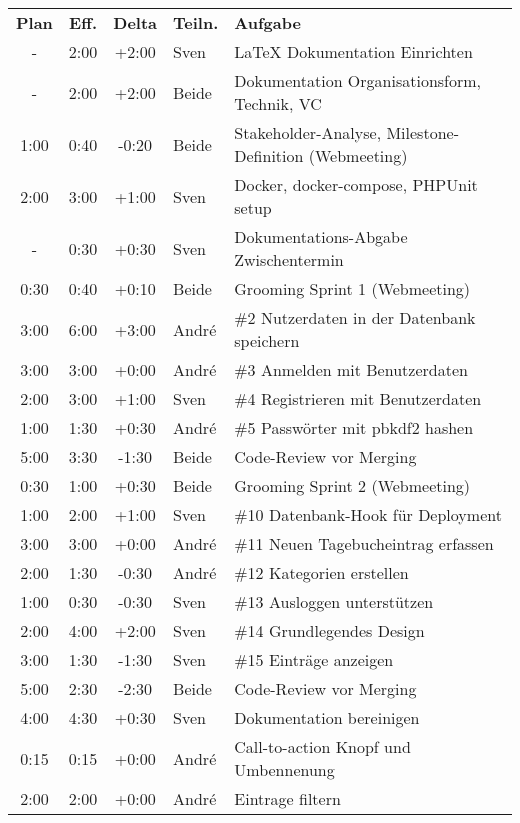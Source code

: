 \begin{longtable}{ c c c l l }
  \textbf{Plan} & \textbf{Eff.} & \textbf{Delta} & \textbf{Teiln.} & \textbf{Aufgabe} \\
  - & 2:00 & +2:00 & Sven & LaTeX Dokumentation Einrichten \\
  - & 2:00 & +2:00 & Beide & Dokumentation Organisationsform, Technik, VC\\
  1:00 & 0:40 & -0:20 & Beide & Stakeholder-Analyse, Milestone-Definition (Webmeeting) \\
  2:00 & 3:00 & +1:00 & Sven & Docker, docker-compose, PHPUnit setup \\
  - & 0:30 & +0:30 & Sven & Dokumentations-Abgabe Zwischentermin \\ 
  0:30 & 0:40 & +0:10 & Beide & Grooming Sprint 1 (Webmeeting) \\
  3:00 & 6:00 & +3:00 & André & \#2 Nutzerdaten in der Datenbank speichern \\
  3:00 & 3:00 & +0:00 & André & \#3 Anmelden mit Benutzerdaten \\
  2:00 & 3:00 & +1:00 & Sven & \#4 Registrieren mit Benutzerdaten \\
  1:00 & 1:30 & +0:30 & André & \#5 Passwörter mit pbkdf2 hashen \\
  5:00 & 3:30 & -1:30 & Beide & Code-Review vor Merging \\
  0:30 & 1:00 & +0:30 & Beide & Grooming Sprint 2 (Webmeeting) \\
  1:00 & 2:00 & +1:00 & Sven & \#10 Datenbank-Hook für Deployment \\
  3:00 & 3:00 & +0:00 & André & \#11 Neuen Tagebucheintrag erfassen \\
  2:00 & 1:30 & -0:30 & André & \#12 Kategorien erstellen \\
  1:00 & 0:30 & -0:30 & Sven & \#13 Ausloggen unterstützen \\
  2:00 & 4:00 & +2:00 & Sven & \#14 Grundlegendes Design \\
  3:00 & 1:30 & -1:30 & Sven & \#15 Einträge anzeigen \\
  5:00 & 2:30 & -2:30 & Beide & Code-Review vor Merging \\
  4:00 & 4:30 & +0:30 & Sven & Dokumentation bereinigen \\
  0:15 & 0:15 & +0:00 & André & Call-to-action Knopf und Umbennenung \\
  2:00 & 2:00 & +0:00 & André & Eintrage filtern \\
\end{longtable}
